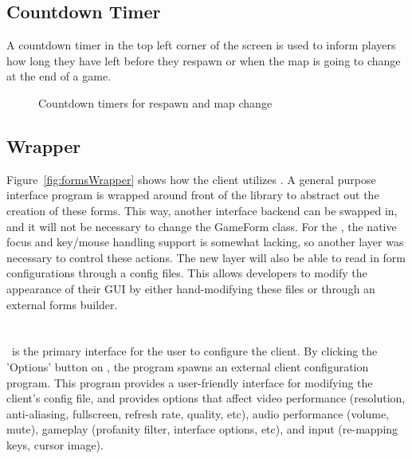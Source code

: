 \subsection{Countdown Timer}

A countdown timer in the top left corner of the screen is used to inform players how long they have left before they respawn or when the map is going to change at the end of a game. 

\begin{figure}[htbp]
	\centering
	\caption{Countdown timers for respawn and map change}
	\label{fig:timer}
\end{figure}

\subsection{\FormWrap Wrapper}

Figure~\ref{fig:formsWrapper}  shows how the client utilizes \FormWrap. A general purpose interface program is wrapped around front of the \FormWrap library to abstract out the creation of these forms. This way, another interface backend can be swapped in, and it will not be necessary to change the GameForm class. For the \FormWrap, the native focus and key/mouse handling support is somewhat lacking, so another layer was necessary to control these actions. The new layer will also be able to read in form configurations through a config files. This allows developers to modify the appearance of their GUI by either hand-modifying these files or through an external forms builder. 
 
\section{\Patcher}

\Patcher\ is the primary interface for the user to configure the client. By clicking the 'Options' button on \Patcher, the program spawns an external client configuration program. This program provides a user-friendly interface for modifying the client's config file, and provides options that affect video performance (resolution, anti-aliasing, fullscreen, refresh rate, quality, etc), audio performance (volume, mute), gameplay (profanity filter, interface options, etc), and input (re-mapping keys, cursor image).

